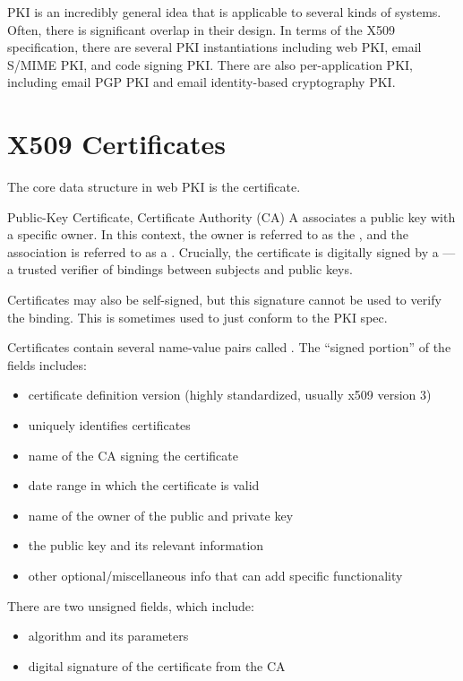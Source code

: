 PKI is an incredibly general idea that is applicable to several kinds of systems. Often, there is significant overlap in their design. In terms of the X509 specification, there are several PKI instantiations including web PKI, email S/MIME PKI, and code signing PKI. There are also per-application PKI, including email PGP PKI and email identity-based cryptography PKI.

\section{X509 Certificates}
The core data structure in web PKI is the certificate.

\begin{dfnbox}{Public-Key Certificate, Certificate Authority (CA)}{}
    A  associates a public key with a specific owner. In this context, the owner is referred to as the , and the association is referred to as a . Crucially, the certificate is digitally signed by a ---a trusted verifier of bindings between subjects and public keys.
\end{dfnbox}

Certificates may also be self-signed, but this signature cannot be used to verify the binding. This is sometimes used to just conform to the PKI spec.

Certificates contain several name-value pairs called . The ``signed portion'' of the fields includes:
\begin{itemize}[noitemsep]
    \item {} certificate definition version (highly standardized, usually x509 version 3)
    \item {} uniquely identifies certificates
    \item {} name of the CA signing the certificate
    \item {} date range in which the certificate is valid
    \item {} name of the owner of the public and private key
    \item {} the public key and its relevant information
    \item {} other optional/miscellaneous info that can add specific functionality
\end{itemize}
There are two unsigned fields, which include:
\begin{itemize}[noitemsep]
    \item {} algorithm and its parameters
    \item {} digital signature of the certificate from the CA
\end{itemize}

